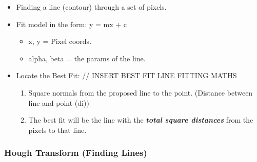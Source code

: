 \documentclass[english, 10pt]{article}
\begin{document}
\begin{itemize}
\item
  Finding a line (contour) through a set of pixels.
\item
  Fit model in the form: y = mx + c

  \begin{itemize}
  \itemsep1pt\parskip0pt
  \item
    x, y = Pixel coords.
  \item
    alpha, beta = the params of the line.
  \end{itemize}
\item
  Locate the Best Fit: // INSERT BEST FIT LINE FITTING MATHS

  \begin{enumerate}
  \def\labelenumi{\arabic{enumi}.}
  \itemsep1pt\parskip0pt
  \item
    Square normals from the proposed line to the point. (Distance
    between line and point (di))
  \item
    The best fit will be the line with the \textbf{\emph{total square
    distances}} from the pixels to that line.
  \end{enumerate}
\end{itemize}

\subsubsection{Hough Transform (Finding
Lines)}\label{hough-transform-finding-lines}
\end{document}
